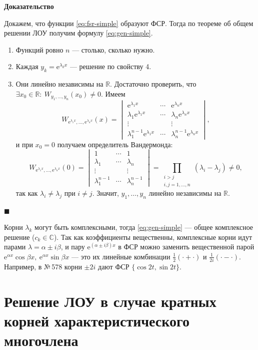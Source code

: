 \documentclass[12pt,a4paper]{article}
\numberwithin{equation}{section}
\newcommand{\R}{\mathbb{R}}
\newcommand{\e}{\mathrm{e}}
\renewenvironment{proof}[1][Доказательство]{\begin{center}\textbf{#1}\end{center}}{\hfill$\blacksquare$\par}
\DeclareRobustCommand{\examtag}[1]{\space{\normalfont\small\color{HSEgray}(#1)}}
\begin{document}
\begin{proof}
Докажем, что функции \eqref{eq:fsr-simple} образуют ФСР. Тогда по теореме об общем решении ЛОУ получим формулу \eqref{eq:gen-simple}.
\begin{enumerate}[start=0]
\item Функций ровно \(n\) --- столько, сколько нужно.
\item Каждая \(y_k=\e^{\lambda_kx}\) --- решение по свойству 4.
\item Они линейно независимы на \(\R\). Достаточно проверить, что \(\exists x_0\in\R:\ W_{y_1,\ldots,y_n}(x_0)\neq0\). Имеем
\[
W_{\e^{\lambda_1x},\ldots,\e^{\lambda_nx}}(x)=
\begin{vmatrix}
\e^{\lambda_1x}&\cdots&\e^{\lambda_nx}\\
\lambda_1\e^{\lambda_1x}&\cdots&\lambda_n\e^{\lambda_nx}\\
\vdots&&\vdots\\
\lambda_1^{n-1}\e^{\lambda_1x}&\cdots&\lambda_n^{n-1}\e^{\lambda_nx}
\end{vmatrix},
\]
и при \(x_0=0\) получаем определитель Вандермонда:
\[
W_{\e^{\lambda_1x},\ldots,\e^{\lambda_nx}}(0)=
\begin{vmatrix}
1&\cdots&1\\
\lambda_1&\cdots&\lambda_n\\
\vdots&&\vdots\\
\lambda_1^{n-1}&\cdots&\lambda_n^{n-1}
\end{vmatrix}
=\prod_{\substack{i>j\\ i,j=1,\ldots,n}}(\lambda_i-\lambda_j)\neq0,
\]
так как \(\lambda_i\neq\lambda_j\) при \(i\neq j\). Значит, \(y_1,\ldots,y_n\) линейно независимы на \(\R\).
\end{enumerate}
\end{proof}

\begin{remarkHSE}
Корни \(\lambda_k\) могут быть комплексными, тогда \eqref{eq:gen-simple} --- общее комплексное решение (\(c_k\in\mathbb C\)). Так как коэффициенты вещественны, комплексные корни идут парами \(\lambda=\alpha\pm i\beta\), и пару \(\e^{(\alpha\pm i\beta)x}\) в ФСР можно заменить вещественной парой \(\e^{\alpha x}\cos\beta x,\ \e^{\alpha x}\sin\beta x\) --- это их линейные комбинации \(\frac12(\cdot+\cdot)\) и \(\frac1{2i}(\cdot-\cdot)\). Например, в №\,578 корни \(\pm2i\) дают ФСР \(\{\cos2t,\sin2t\}\).
\end{remarkHSE}

\section[Кратные корни характеристического многочлена\examtag{вопрос~20}]{Решение ЛОУ в случае кратных корней характеристического многочлена\examtag{вопрос~20}}
\label{sec:roots-multiple}
\end{document}
